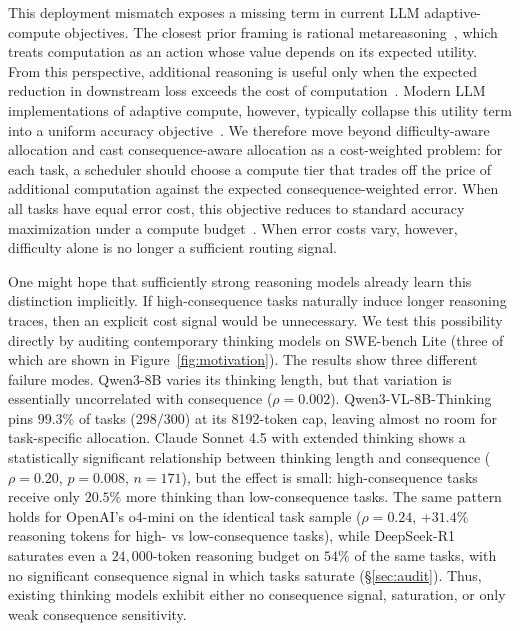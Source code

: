 \documentclass{article}
\begin{document}
This deployment mismatch exposes a missing term in current LLM adaptive-compute objectives. The closest prior framing is rational metareasoning~\citep{russell1991right, hay2012selecting,
yang2024rational}, which treats computation as an action whose value
depends on its expected utility. From this perspective, additional reasoning is useful only when the expected reduction in downstream loss exceeds the cost of computation~\citep{alomrani2025reasoningbudget}. Modern LLM implementations of adaptive compute, however, typically collapse this utility term into a uniform accuracy objective~\citep{li2025reasoningllms}. We therefore move beyond difficulty-aware allocation and cast consequence-aware allocation as a cost-weighted problem: for each task, a scheduler should choose a compute tier that trades off the price of additional computation against the expected consequence-weighted error. When all tasks have equal error cost, this objective reduces to standard accuracy maximization under a compute budget~\citep{alomrani2025reasoningbudget}. When error costs vary, however, difficulty alone is no longer a sufficient routing signal.

One might hope that sufficiently strong reasoning models already learn
this distinction implicitly. If high-consequence tasks naturally induce
longer reasoning traces, then an explicit cost signal would be unnecessary. We test this possibility directly by
auditing contemporary thinking models on SWE-bench Lite (three of
which are shown in Figure~\ref{fig:motivation}). The results show three different failure
modes. Qwen3-8B varies its thinking length, but that variation is
essentially uncorrelated with consequence
($\rho = 0.002$). Qwen3-VL-8B-Thinking pins $99.3\%$ of tasks ($298/300$) at its
8192-token cap, leaving almost no room for task-specific allocation.
Claude Sonnet 4.5 with extended thinking shows a statistically
significant relationship between thinking length and consequence
($\rho = 0.20$, $p = 0.008$, $n = 171$), but the effect is small:
high-consequence tasks receive only $20.5\%$ more thinking than
low-consequence tasks. The same pattern holds for OpenAI's o4-mini on
the identical task sample ($\rho = 0.24$, $+31.4\%$ reasoning tokens
for high- vs low-consequence tasks), while DeepSeek-R1 saturates even
a $24{,}000$-token reasoning budget on $54\%$ of the same tasks, with
no significant consequence signal in which tasks saturate
(\S\ref{sec:audit}).
Thus, existing thinking models exhibit either no
consequence signal, saturation, or only weak consequence sensitivity.
\end{document}
